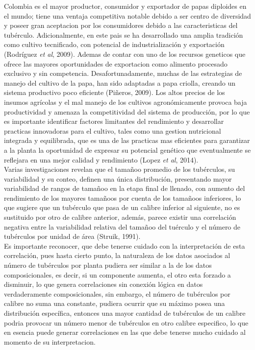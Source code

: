 Colombia es el mayor productor, consumidor y exportador de papas diploides en el mundo; tiene una ventaja competitiva notable debido a ser centro de diversidad y poseer gran aceptacion por los consumidores debido a las caracteristicas del tubérculo. Adicionalmente, en este pais se ha desarrollado una amplia tradición como cultivo tecnificado, con potencial de industrialización y exportación (Rodríguez \textit{et al}, 2009). Ademas de contar con uno de los recursos geneticos que ofrece las mayores oportunidades de exportacion como alimento procesado exclusivo y sin competencia. Desafortunadamente, muchas de las estrategias de manejo del cultivo de la papa, han sido adaptadas a papa criolla, creando un sistema productivo poco eficiente (Piñeros, 2009). Los altos precios de los insumos agrícolas y el mal manejo de los cultivos agronómicamente provoca  baja productividad y amenaza la competitividad del sistema de producción, por lo que es importante identificar factores limitantes del rendimiento y desarrollar practicas innovadoras para el cultivo, tales como una gestion nutricional integrada y equilibrada, que es una de las practicas mas eficientes para garantizar a la planta la oportunidad de expresar su potencial genético que eventualmente se reflejara en una mejor calidad y rendimiento (Lopez \textit{et al}, 2014).\\
 
Varias investigaciones revelan que el tamañoo promedio de los tubérculos, su variabilidad y su conteo, definen una única distribución, presentando mayor variabilidad de rangos de tamañoo en la etapa final de llenado, con aumento del rendimiento de los mayores tamañoos por cuenta de los tamañoos inferiores, lo que sugiere que un tubérculo que pasa de un calibre inferior al siguiente, no es sustituido por otro de calibre anterior, además, parece existir una correlación negativa entre la variabilidad relativa del tamañoo del tuérculo y el número de tubérculos por unidad de área (Struik, 1991).\\

Es importante reconocer, que debe tenerse cuidado con la interpretación de esta correlación, pues hasta cierto punto, la naturaleza de los datos asociados al número de tubérculos por planta pudiera ser similar a la de los datos composicionales, es decir, si un componente aumenta, el otro esta forzado a disminuir, lo que genera correlaciones sin conexión lógica en datos verdaderamente composicionales, sin embargo, el número de tubérculos por calibre no suma una constante, pudiera ocurrir que su máximo posea una distribución específica, entonces una mayor cantidad de tubérculos de un calibre podria provocar un número menor de tubérculos en otro calibre especifico, lo que en esencia puede generar correlaciones en las que debe tenerse mucho cuidado al momento de su interpretacion.\\

